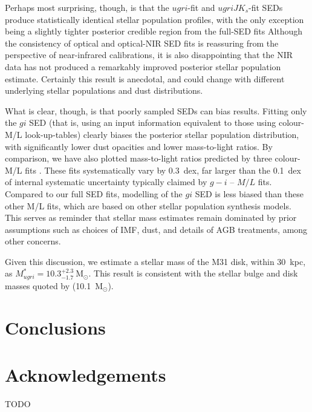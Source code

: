 \documentclass{iau}
\newcommand{\mnras}{MNRAS}       %
\begin{document}
Perhaps most surprising, though, is that the $ugri$-fit and $ugriJK_s$-fit SEDs produce statistically identical stellar population profiles, with the only exception being a slightly tighter posterior credible region from the full-SED fits
Although the consistency of optical and optical-NIR SED fits is reassuring from the perspective of near-infrared calibrations, it is also disappointing that the NIR data has not produced a remarkably improved posterior stellar population estimate.
Certainly this result is anecdotal, and could change with different underlying stellar populations and dust distributions.

What is clear, though, is that poorly sampled SEDs can bias results.
Fitting only the $gi$ SED (that is, using an input information equivalent to those using colour-M/L look-up-tables) clearly biases the posterior stellar population distribution, with significantly lower dust opacities and lower mass-to-light ratios. 
By comparison, we have also plotted mass-to-light ratios predicted by three colour-M/L fits \citep{Zibetti:2009,Taylor:2011,Into:2013}.
These fits systematically vary by 0.3~dex, far larger than the 0.1~dex of internal systematic uncertainty typically claimed by $g-i$ -- $M/L$ fits. 
Compared to our full SED fits, modelling of the $gi$ SED is less biased than these other M/L fits, which are based on other stellar population synthesis models.
This serves as reminder that stellar mass estimates remain dominated by prior assumptions such as choices of IMF, dust, and details of AGB treatments, among other concerns.

Given this discussion, we estimate a stellar mass of the M31 disk, within $30$~kpc, as $M_{ugri}^{*} = 10.3^{+2.3}_{-1.7}~\mathrm{M}_\odot$.
This result is consistent with the stellar bulge and disk masses quoted by \cite{Tamm:2012} (10.1~$\mathrm{M}_\odot$).

\section{Conclusions}


\section*{Acknowledgements}

\noindent TODO





\end{document}
